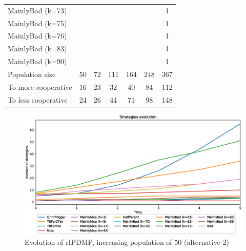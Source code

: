 \documentclass[journal,10pt,twoside]{IEEEtran}
\begin{document}
\begin{table}[ht]
\begin{tabular}{l|cccccc}
        MainlyBad (k=73)     &     &     &      &      &      &    1 \\
        MainlyBad (k=75)     &     &     &      &      &      &    1 \\
        MainlyBad (k=76)     &     &     &      &      &      &    1 \\
        MainlyBad (k=83)     &     &     &      &      &      &    1 \\
        MainlyBad (k=90)     &     &     &      &      &      &    1 \\ \midrule
        Population size      &  50 &  72 &  111 &  164 &  248 &  367 \\
        To more cooperative  &  16 &  23 &   32 &   40 &   84 &  112 \\
        To less cooperative  &  24 &  26 &   44 &   71 &   98 &  148 \\ \bottomrule

    \end{tabular}
\end{table}

\begin{figure}[!ht]
    \centering
    \includegraphics[width=1\columnwidth]{../img/ripdmp-incr/alt2/ripdmp-evolution-increasing-pop-50}
    \caption{Evolution of rIPDMP, increasing population of 50 (alternative 2)}
    \label{fig:incrRa2}
\end{figure}
\end{document}
